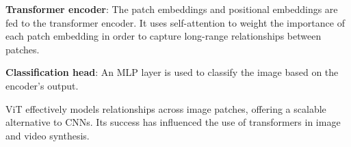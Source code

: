 \textbf{Transformer encoder}: The patch embeddings and positional embeddings are fed to the transformer encoder. It uses self-attention to weight the importance of each patch embedding in order to capture long-range relationships between patches.

\textbf{Classification head}: An MLP layer is used to classify the image based on the encoder's output.

ViT effectively models relationships across image patches, offering a scalable alternative to CNNs. Its success has influenced the use of transformers in image and video synthesis.